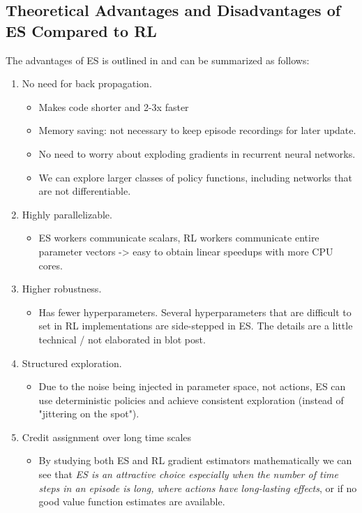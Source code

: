 \subsection{Theoretical Advantages and Disadvantages of ES Compared to RL}
The advantages of ES is outlined in \cite{Karpathy} and can be summarized as follows:
\begin{enumerate}
    \item No need for back propagation.
    \begin{itemize}
        \item Makes code shorter and 2-3x faster
        \item Memory saving: not necessary to keep episode recordings for later update.
        \item No need to worry about exploding gradients in recurrent neural networks.
        \item We can explore larger classes of policy functions, including networks that are not differentiable. 
    \end{itemize}
    \item Highly parallelizable.
    \begin{itemize}
        \item ES workers communicate scalars, RL workers communicate entire parameter vectors -> easy to obtain linear speedups with more CPU cores.
    \end{itemize}
    \item Higher robustness.
    \begin{itemize}
        \item Has fewer hyperparameters. Several hyperparameters that are difficult to set in RL implementations are side-stepped in ES. The details are a little technical / not elaborated in blot post.
    \end{itemize}

    \item Structured exploration.
    \begin{itemize}
        \item Due to the noise being injected in parameter space, not actions, ES can use deterministic policies and achieve consistent exploration (instead of "jittering on the spot"). 
    \end{itemize}
    \item Credit assignment over long time scales
    \begin{itemize}
        \item By studying both ES and RL gradient estimators mathematically we can see that \emph{ES is an attractive choice especially when the number of time steps in an episode is long, where actions have long-lasting effects}, or if no good value function estimates are available.
    \end{itemize}
\end{enumerate}

